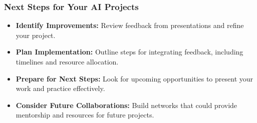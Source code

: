 \documentclass{beamer}
\begin{document}
\begin{frame}[fragile]
    \frametitle{Next Steps for Your AI Projects}

    \begin{itemize}
        \item \textbf{Identify Improvements:} 
        Review feedback from presentations and refine your project.
        \item \textbf{Plan Implementation:} 
        Outline steps for integrating feedback, including timelines and resource allocation.
        \item \textbf{Prepare for Next Steps:} 
        Look for upcoming opportunities to present your work and practice effectively.
        \item \textbf{Consider Future Collaborations:} 
        Build networks that could provide mentorship and resources for future projects.
    \end{itemize}
\end{frame}
\end{document}
